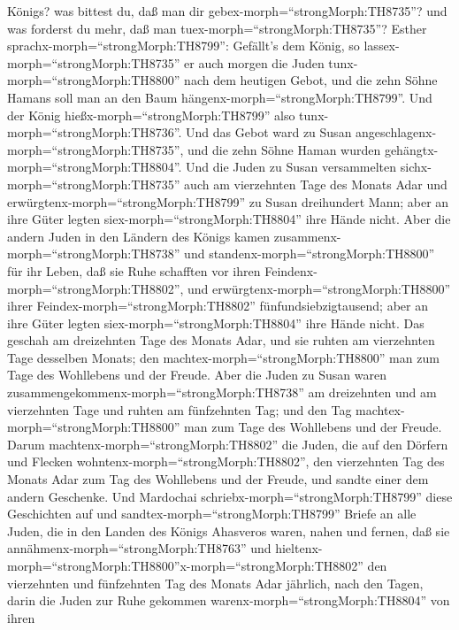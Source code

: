 Königs? was bittest du, daß man dir gebex-morph=``strongMorph:TH8735''?
und was forderst du mehr, daß man tuex-morph=``strongMorph:TH8735''?
 Esther sprachx-morph=``strongMorph:TH8799'': Gefällt's dem
König, so lassex-morph=``strongMorph:TH8735'' er auch morgen die Juden
tunx-morph=``strongMorph:TH8800'' nach dem heutigen Gebot, und die zehn
Söhne Hamans soll man an den Baum hängenx-morph=``strongMorph:TH8799''.
 Und der König hießx-morph=``strongMorph:TH8799'' also
tunx-morph=``strongMorph:TH8736''. Und das Gebot ward zu Susan
angeschlagenx-morph=``strongMorph:TH8735'', und die zehn Söhne Haman
wurden gehängtx-morph=``strongMorph:TH8804''.  Und die
Juden zu Susan versammelten sichx-morph=``strongMorph:TH8735'' auch am
vierzehnten Tage des Monats Adar und
erwürgtenx-morph=``strongMorph:TH8799'' zu Susan dreihundert Mann; aber
an ihre Güter legten siex-morph=``strongMorph:TH8804'' ihre Hände nicht.
 Aber die andern Juden in den Ländern des Königs kamen
zusammenx-morph=``strongMorph:TH8738'' und
standenx-morph=``strongMorph:TH8800'' für ihr Leben, daß sie Ruhe
schafften vor ihren Feindenx-morph=``strongMorph:TH8802'', und
erwürgtenx-morph=``strongMorph:TH8800'' ihrer
Feindex-morph=``strongMorph:TH8802'' fünfundsiebzigtausend; aber an ihre
Güter legten siex-morph=``strongMorph:TH8804'' ihre Hände nicht.
 Das geschah am dreizehnten Tage des Monats Adar, und sie
ruhten am vierzehnten Tage desselben Monats; den
machtex-morph=``strongMorph:TH8800'' man zum Tage des Wohllebens und der
Freude.  Aber die Juden zu Susan waren
zusammengekommenx-morph=``strongMorph:TH8738'' am dreizehnten und am
vierzehnten Tage und ruhten am fünfzehnten Tag; und den Tag
machtex-morph=``strongMorph:TH8800'' man zum Tage des Wohllebens und der
Freude.  Darum machtenx-morph=``strongMorph:TH8802'' die
Juden, die auf den Dörfern und Flecken
wohntenx-morph=``strongMorph:TH8802'', den vierzehnten Tag des Monats
Adar zum Tag des Wohllebens und der Freude, und sandte einer dem andern
Geschenke.  Und Mardochai
schriebx-morph=``strongMorph:TH8799'' diese Geschichten auf und
sandtex-morph=``strongMorph:TH8799'' Briefe an alle Juden, die in den
Landen des Königs Ahasveros waren, nahen und fernen,  daß
sie annähmenx-morph=``strongMorph:TH8763'' und
hieltenx-morph=``strongMorph:TH8800''x-morph=``strongMorph:TH8802'' den
vierzehnten und fünfzehnten Tag des Monats Adar jährlich, 
nach den Tagen, darin die Juden zur Ruhe gekommen
warenx-morph=``strongMorph:TH8804'' von ihren
